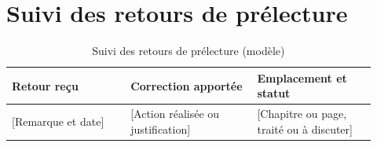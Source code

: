 \chapter{Suivi des retours de prélecture}

\begin{table}[htbp]
  \centering
  \caption{Suivi des retours de prélecture (modèle)}
  \label{tab:suivi-prelecture}
  \begin{tabular}{@{}p{0.30\linewidth}p{0.32\linewidth}p{0.30\linewidth}@{}}
    \toprule
    \textbf{Retour reçu} & \textbf{Correction apportée} & \textbf{Emplacement et statut} \\
    \midrule
    {[Remarque et date]} & {[Action réalisée ou justification]} & {[Chapitre ou page, traité ou à discuter]} \\
    \bottomrule
  \end{tabular}
\end{table}

